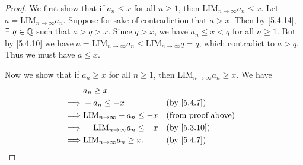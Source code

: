 \begin{proof}
  We first show that if \(a_n \leq x\) for all \(n \geq 1\), then \(\text{LIM}_{n \to \infty} a_n \leq x\).
  Let \(a = \text{LIM}_{n \to \infty} a_n\).
  Suppose for sake of contradiction that \(a > x\).
  Then by \cref{5.4.14}, \(\exists\ q \in \mathbb{Q}\) such that \(a > q > x\).
  Since \(q > x\), we have \(a_n \leq x < q\) for all \(n \geq 1\).
  But by \cref{5.4.10} we have \(a = \text{LIM}_{n \to \infty} a_n \leq \text{LIM}_{n \to \infty} q = q\), which contradict to \(a > q\).
  Thus we must have \(a \leq x\).

  Now we show that if \(a_n \geq x\) for all \(n \geq 1\), then \(\text{LIM}_{n \to \infty} a_n \geq x\).
  We have
  \begin{align*}
             & a_n \geq x                                                            \\
    \implies & -a_n \leq -x                           &  & \by{5.4.7}                \\
    \implies & \text{LIM}_{n \to \infty} -a_n \leq -x &  & \text{(from proof above)} \\
    \implies & -\text{LIM}_{n \to \infty} a_n \leq -x &  & \text{(by \cref{5.3.10})} \\
    \implies & \text{LIM}_{n \to \infty} a_n \geq x.  &  & \by{5.4.7}
  \end{align*}
\end{proof}